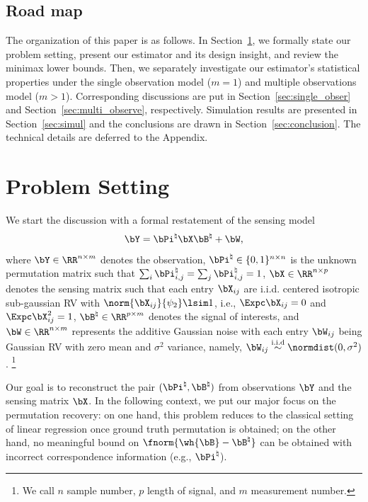 \documentclass[11pt]{article}
\def \bPitrue {\bPi^{\natural}}
\def \bBtrue {\bB^{\natural}}
\begin{document}
\subsection{Road map}
The organization of this paper is as follows.
In Section~\ref{sec:alg_descrip}, we formally state our
problem setting, present our estimator and its design insight, and review the minimax lower bounds. Then, we separately investigate our estimator's statistical properties
under the single observation model ($m = 1$)
and multiple observations model ($m > 1$).
Corresponding discussions are put in
 Section~\ref{sec:single_obser} and Section~\ref{sec:multi_observe}, respectively.
Simulation results are presented in Section~\ref{sec:simul} and the
conclusions are drawn in  Section~\ref{sec:conclusion}. The technical
details are deferred to the Appendix.



\section{Problem Setting}\label{sec:alg_descrip}
We start the discussion with a formal restatement of the
sensing model
\vspace{-0.05in}
\begin{align}
\label{eq:sys_model_unlabel_sense}
\bY = \bPitrue \bX \bBtrue + \bW,
\vspace{-0.05in}
\end{align}
where $\bY \in \RR^{n\times m}$ denotes the observation,
$\bPitrue \in \{0, 1\}^{n\times n}$ is the unknown permutation matrix
such that $\sum_i \bPitrue_{i, j} = \sum_{j}\bPitrue_{i,j} = 1$,
$\bX\in \RR^{n\times p}$ denotes the
sensing matrix such that
 each entry $\bX_{ij}$ are i.i.d. centered isotropic sub-gaussian RV with
 $\norm{\bX_{ij}}{\psi_2} \lsim 1$, i.e.,
 $\Expc \bX_{ij} = 0$ and $\Expc \bX_{ij}^2 = 1$,
$\bBtrue\in \RR^{p\times m}$ denotes the signal of interests,
and $\bW \in \RR^{n\times m}$ represents the additive Gaussian noise
with each entry $\bW_{ij}$ being Gaussian RV with zero mean
and $\sigma^2$ variance, namely,
$\bW_{ij}\stackrel{\textup{i.i.d}}{\sim} \normdist(0, \sigma^2)$.
\footnote{We call $n$ sample number, $p$ length of signal, and $m$ measurement number.}

Our goal is to reconstruct the pair
$(\bPitrue, \bBtrue)$ from observations $\bY$ and the
sensing matrix $\bX$. In the following context, we put our major focus on the
permutation recovery:
on one hand, this problem reduces to the classical setting of linear regression once ground truth permutation is obtained; on the other hand,
no meaningful bound on $\fnorm{\wh{\bB} - \bBtrue}$ can be obtained with incorrect correspondence information (e.g., $\bPitrue$).
\end{document}

